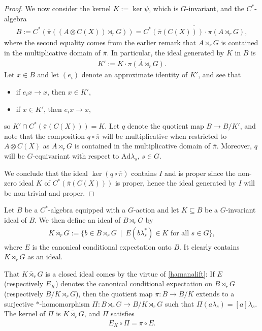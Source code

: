 \begin{proof}
	We now consider the kernel $K := \ker \psi$, which is $G$-invariant, and the $C^*$-algebra
	\begin{align*}
		B := C^*(\overline \pi ( ( A \otimes C(X)) \rtimes_r G)) = \overline{ C^*(\overline \pi(C(X))) \cdot \pi(A \rtimes_r G)},
	\end{align*}
	where the second equality comes from the earlier remark that $A \rtimes_r G$ is contained in the multiplicative domain of $\overline \pi$. In particular, the ideal generated by $K$ in $B$ is
	\begin{align*}
		K' :=\overline{K \cdot \pi(A \rtimes_r G)}.
	\end{align*}
	Let $x \in B$ and let $(e_i)$ denote an approximate identity of $K'$, and see that
	\begin{itemize}[nosep]
		\item if $e_i x \to x$, then $x \in K'$,
		\item if $x \in K'$, then $e_i x \to x$,
	\end{itemize}
	so $K' \cap C^*(\overline \pi(C(X))) = K$. Let $q$ denote the quotient map $B \to B/K'$, and note that the composition $q \circ \overline \pi$ will be multiplicative when restricted to $A \otimes C(X)$ as $A \rtimes_r G$ is contained in the multiplicative domain of $\overline \pi$. Moreover, $q$ will be $G$-equivariant with respect to $\mathrm{Ad} \lambda_s$, $s \in G$. 

	We conclude that the ideal $\ker (q \circ \overline \pi)$ contains $I$ and is proper since the non-zero ideal $K$ of $C^*(\overline \pi(C(X)))$ is proper, hence the ideal generated by $I$ will be non-trivial and proper.
\end{proof}
\begin{definition}
	Let $B$ be a $C^*$-algebra equipped with a $G$-action and let $K \subseteq B$ be a $G$-invariant ideal of $B$. We then define an ideal  of $B \rtimes_r G$ by
	\begin{align*}
		K \bar \rtimes_r G := \{b \in B \rtimes_r G \ \mid \ E(b \lambda_s^* ) \in K \text{ for all } s \in G\},
	\end{align*}
	where $E$ is the canonical conditional expectation onto $B$. It clearly contains $K \rtimes_r G$ as an ideal.
\end{definition}
\begin{remark}
	That $K \bar \rtimes_r G$ is a closed ideal comes by the virtue of \cref{hamanalift}: If $E$ (respectively $E_K$) denotes the canonical conditional expectation on $B \rtimes_r G$ (respectively $B/K \rtimes_r G$), then the quotient map $\pi \colon B \to B/K$ extends to a surjective $*$-homomorphism $\Pi \colon B \rtimes_r G \to B/K \rtimes_r G$ such that $\Pi(a \lambda_s) = [a] \lambda_s$. The kernel of $\Pi$ is $K \bar \rtimes_r G$, and $\Pi$ satisfies
	\begin{align*}
		E_K \circ \Pi =  \pi \circ E.
	\end{align*}
	\label{condidealrem}
\end{remark}
